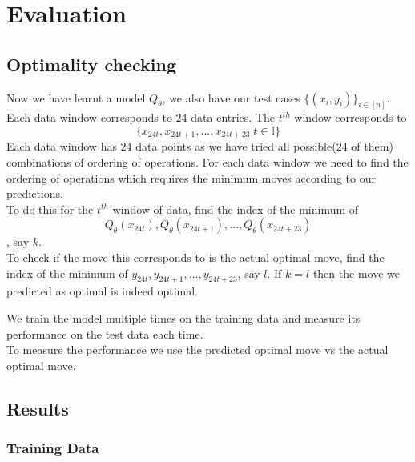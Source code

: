\chapter{Evaluation}
\label{chapter:evaluation}
\thispagestyle{myheadings}

\graphicspath{}
\section{Optimality checking}
Now we have learnt a model $Q_{\theta}$, we also have our test cases $\{(x_{i},y_{i})\}_{i\in[n]}$.\\
Each data window corresponds to $24$ data entries. The $t^{th}$ window corresponds to 
$$\{x_{24t}, x_{24t+1}, ..., x_{24t+23}|t\in\mathbb{I}\}$$
Each data window has $24$ data points as we have tried all possible($24$ of them) combinations of ordering of operations. For each data window we need to find the ordering of operations which requires the minimum moves according to our predictions.\\
To do this for the $t^{th}$ window of data, find the index of the minimum of $$Q_{\theta}(x_{24t}),Q_{\theta}(x_{24t+1}),...,Q_{\theta}(x_{24t+23})$$, say $k$.\\
To check if the move this corresponds to is the actual optimal move, find the index of the minimum of $y_{24t}, y_{24t+1}, ..., y_{24t+23}$, say $l$. If $k=l$ then the move we predicted as optimal is indeed optimal.\\ 
\par We train the model multiple times on the training data and measure its performance on the test data each time.\\
To measure the performance we use the predicted optimal move vs the actual optimal move.\\
\section{Results}
\subsection{Training Data}
